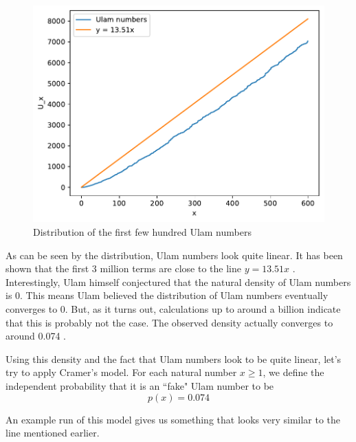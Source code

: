 \documentclass[conference]{IEEEtran}
\begin{document}
\begin{figure}[H]
  \centering
  \includegraphics[width=\linewidth,keepaspectratio]{../images/Ulam_distribution.pdf}
  \caption{Distribution of the first few hundred Ulam numbers}
\end{figure}

As can be seen by the distribution, Ulam numbers look quite linear. It has been shown that the first 3 million terms are close to the line $y = 13.51x$ \cite{b2}. Interestingly, Ulam himself conjectured that the natural density of Ulam numbers is 0. This means Ulam believed the distribution of Ulam numbers eventually converges to 0. But, as it turns out, calculations up to around a billion indicate that this is probably not the case. The observed density actually converges to around 0.074 \cite{b2}. 

Using this density and the fact that Ulam numbers look to be quite linear, let's try to apply Cramer's model. For each natural number $x \ge 1$, we define the independent probability that it is an ``fake" Ulam number to be \[p(x) = 0.074\]

An example run of this model gives us something that looks very similar to the line mentioned earlier.
\end{document}
